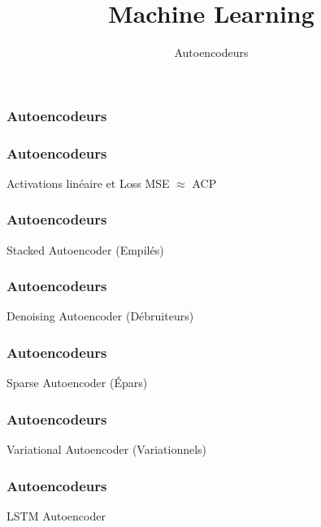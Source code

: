 \documentclass{formation}
\title{Machine Learning}
\subtitle{Autoencodeurs}
\begin{document}
\maketitle

\begin{frame}
  \frametitle{Autoencodeurs}
\end{frame}

\begin{frame}
  \frametitle{Autoencodeurs}
  Activations linéaire et Loss MSE $\approx$ ACP
\end{frame}

\begin{frame}
  \frametitle{Autoencodeurs}
  Stacked Autoencoder (Empilés)
\end{frame}

\begin{frame}
  \frametitle{Autoencodeurs}
  Denoising Autoencoder (Débruiteurs)
\end{frame}

\begin{frame}
  \frametitle{Autoencodeurs}
  Sparse Autoencoder (Épars)
\end{frame}

\begin{frame}
  \frametitle{Autoencodeurs}
  Variational Autoencoder (Variationnels)
\end{frame}

\begin{frame}
  \frametitle{Autoencodeurs}
  LSTM Autoencoder
\end{frame}
\end{document}
